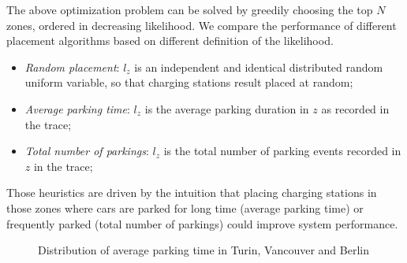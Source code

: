 The above optimization problem can be solved by greedily choosing the top $N$ zones, ordered in decreasing likelihood. We compare the performance of different placement algorithms based on different definition of the likelihood.
\begin{itemize}
	\item{\it Random placement}: $l_z$ is an independent and identical distributed random uniform variable, so that charging stations result placed at random;
	\item{\it Average parking time}: $l_z$ is the average parking duration in $z$ as recorded in the trace;
	\item{\it Total number of parkings}: $l_z$ is the total number of parking events recorded in $z$ in the trace;
\end{itemize}
Those heuristics are driven by the intuition that placing charging stations in those zones where cars are parked for long time (average parking time) or frequently parked (total number of parkings) could improve system performance.


\begin{figure}[th]
	\centering     %
	\quad
	\quad
	\caption{Distribution of average parking time in Turin, Vancouver and Berlin}
	\label{fig:5_4_heatmap_avgparking}
\end{figure}

